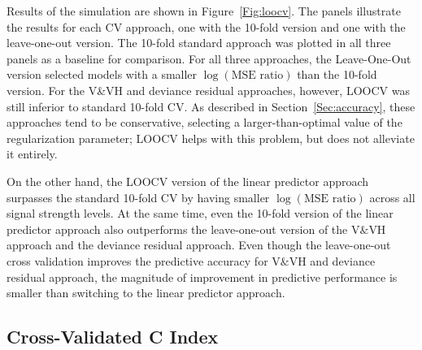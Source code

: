 Results of the simulation are shown in Figure~\ref{Fig:loocv}. The panels illustrate the results for each CV approach, one with the 10-fold version and one with the leave-one-out version. The 10-fold standard approach was plotted in all three panels as a baseline for comparison.  For all three approaches, the Leave-One-Out version selected models with a smaller $\log(\text{MSE ratio})$ than the 10-fold version. For the V\&VH and deviance residual approaches, however, LOOCV was still inferior to standard 10-fold CV.  As described in Section~\ref{Sec:accuracy}, these approaches tend to be conservative, selecting a larger-than-optimal value of the regularization parameter; LOOCV helps with this problem, but does not alleviate it entirely.

On the other hand, the LOOCV version of the linear predictor approach surpasses the standard 10-fold CV by having smaller $\log(\text{MSE ratio})$ across all signal strength levels. At the same time, even the 10-fold version of the linear predictor approach also outperforms the leave-one-out version of the V$\&$VH approach and the deviance residual approach. Even though the leave-one-out cross validation improves the predictive accuracy for V$\&$VH and deviance residual approach, the magnitude of improvement in predictive performance is smaller than switching to the linear predictor approach.

\subsection {Cross-Validated C Index}
\label{Sec:CIndex}

